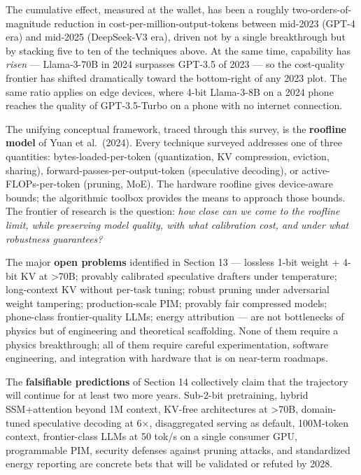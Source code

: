 \documentclass{article}
\begin{document}
The cumulative effect, measured at the wallet, has been a roughly two-orders-of-magnitude reduction in cost-per-million-output-tokens between mid-2023 (GPT-4 era) and mid-2025 (DeepSeek-V3 era), driven not by a single breakthrough but by stacking five to ten of the techniques above. At the same time, capability has \emph{risen} --- Llama-3-70B in 2024 surpasses GPT-3.5 of 2023 --- so the cost-quality frontier has shifted dramatically toward the bottom-right of any 2023 plot. The same ratio applies on edge devices, where 4-bit Llama-3-8B on a 2024 phone reaches the quality of GPT-3.5-Turbo on a phone with no internet connection.

The unifying conceptual framework, traced through this survey, is the \textbf{roofline model} of Yuan et al.~(2024). Every technique surveyed addresses one of three quantities: bytes-loaded-per-token (quantization, KV compression, eviction, sharing), forward-passes-per-output-token (speculative decoding), or active-FLOPs-per-token (pruning, MoE). The hardware roofline gives device-aware bounds; the algorithmic toolbox provides the means to approach those bounds. The frontier of research is the question: \emph{how close can we come to the roofline limit, while preserving model quality, with what calibration cost, and under what robustness guarantees?}

The major \textbf{open problems} identified in Section 13 --- lossless 1-bit weight + 4-bit KV at \textgreater70B; provably calibrated speculative drafters under temperature; long-context KV without per-task tuning; robust pruning under adversarial weight tampering; production-scale PIM; provably fair compressed models; phone-class frontier-quality LLMs; energy attribution --- are not bottlenecks of physics but of engineering and theoretical scaffolding. None of them require a physics breakthrough; all of them require careful experimentation, software engineering, and integration with hardware that is on near-term roadmaps.

The \textbf{falsifiable predictions} of Section 14 collectively claim that the trajectory will continue for at least two more years. Sub-2-bit pretraining, hybrid SSM+attention beyond 1M context, KV-free architectures at \textgreater70B, domain-tuned speculative decoding at 6×, disaggregated serving as default, 100M-token context, frontier-class LLMs at 50 tok/s on a single consumer GPU, programmable PIM, security defenses against pruning attacks, and standardized energy reporting are concrete bets that will be validated or refuted by 2028.
\end{document}
